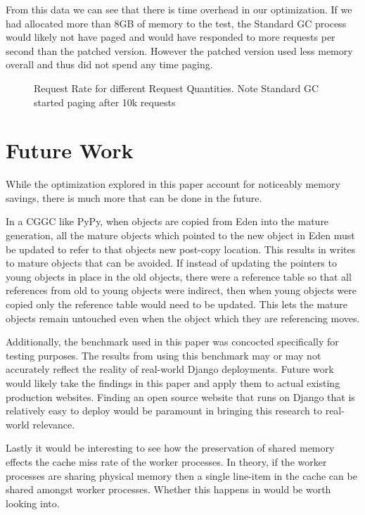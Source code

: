 \documentclass{article}
\begin{document}
From this data we can see that there is time overhead in our optimization.  If we had allocated more than 8GB of memory to the test, the Standard GC process would likely not have paged and would have responded to more requests per second than the patched version.  However the patched version used less memory overall and thus did not spend any time paging.  

\begin{figure}\label{fig:latency}
    \resizebox{0.5\textwidth}{!}{}
    \caption{Request Rate for different Request Quantities.  Note Standard GC started paging after 10k requests}
\end{figure}

\section{Future Work}\label{sec:futurework}

While the optimization explored in this paper account for noticeably memory savings, there is much more that can be done in the future.

In a CGGC like PyPy, when objects are copied from Eden into the mature generation, all the mature objects which pointed to the new object in Eden must be updated to refer to that objects new post-copy location.  This results in writes to mature objects that can be avoided.  If instead of updating the pointers to young objects in place in the old objects, there were a reference table so that all references from old to young objects were indirect, then when young objects were copied only the reference table would need to be updated.  This lets the mature objects remain untouched even when the object which they are referencing moves.  

Additionally, the benchmark used in this paper was concocted specifically for testing purposes.  The results from using this benchmark may or may not accurately reflect the reality of real-world Django deployments.  Future work would likely take the findings in this paper and apply them to actual existing production websites.  Finding an open source website that runs on Django that is relatively easy to deploy would be paramount in bringing this research to real-world relevance.  

Lastly it would be interesting to see how the preservation of shared memory effects the cache miss rate of the worker processes.  In theory, if the worker processes are sharing physical memory then a single line-item in the cache can be shared amongst worker processes.  Whether this happens in would be worth looking into.  
\end{document}
